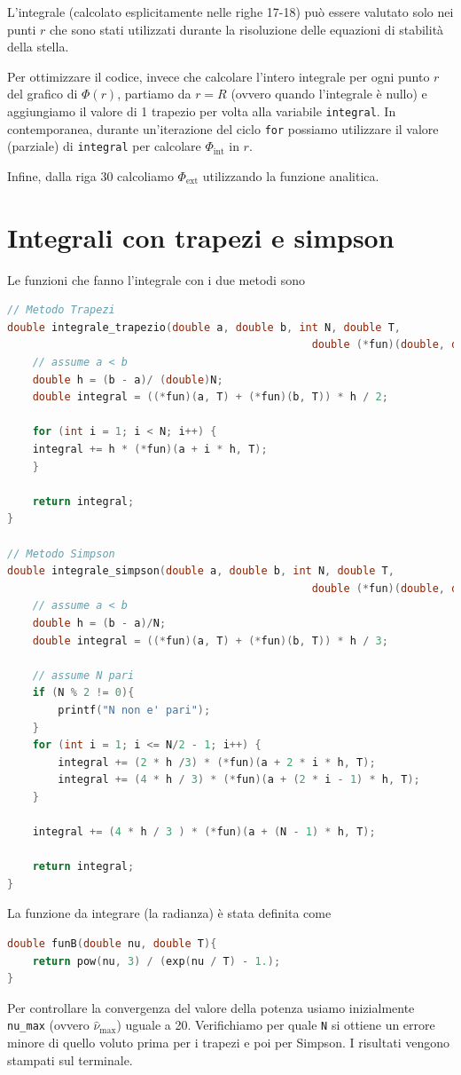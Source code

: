 \documentclass[a4paper, titlepage]{article}
\begin{document}
L'integrale (calcolato esplicitamente nelle righe 17-18) può essere valutato
solo nei punti $r$ che sono stati utilizzati durante la risoluzione delle
equazioni di stabilità della stella.

Per ottimizzare il codice, invece che calcolare l'intero integrale per ogni
punto $r$ del grafico di $\Phi(r)$, partiamo da $r = R$ (ovvero quando
l'integrale è nullo) e aggiungiamo il valore di 1 trapezio per volta alla
variabile \texttt{integral}. In contemporanea, durante un'iterazione del ciclo
\texttt{for} possiamo utilizzare il valore (parziale) di \texttt{integral} per
calcolare $\Phi_\text{int}$ in $r$.

Infine, dalla riga 30 calcoliamo $\Phi_\text{ext}$ utilizzando la funzione
analitica.


\section{Integrali con trapezi e simpson} \label{ap:integrali}

Le funzioni che fanno l'integrale con i due metodi sono

\begin{lstlisting}[language=C]
// Metodo Trapezi
double integrale_trapezio(double a, double b, int N, double T,
                                                double (*fun)(double, double)){
    // assume a < b
    double h = (b - a)/ (double)N;
    double integral = ((*fun)(a, T) + (*fun)(b, T)) * h / 2;

    for (int i = 1; i < N; i++) {
    integral += h * (*fun)(a + i * h, T);
    }

    return integral;
}

// Metodo Simpson
double integrale_simpson(double a, double b, int N, double T,
                                                double (*fun)(double, double)){
    // assume a < b
    double h = (b - a)/N;
    double integral = ((*fun)(a, T) + (*fun)(b, T)) * h / 3;

    // assume N pari
    if (N % 2 != 0){
        printf("N non e' pari");
    }
    for (int i = 1; i <= N/2 - 1; i++) {
        integral += (2 * h /3) * (*fun)(a + 2 * i * h, T);
        integral += (4 * h / 3) * (*fun)(a + (2 * i - 1) * h, T);
    }

    integral += (4 * h / 3 ) * (*fun)(a + (N - 1) * h, T);

    return integral;
}
\end{lstlisting}

La funzione da integrare (la radianza) è stata definita come
\begin{lstlisting}[language=C]
double funB(double nu, double T){
    return pow(nu, 3) / (exp(nu / T) - 1.);
}
\end{lstlisting}
Per controllare la convergenza del valore della potenza usiamo inizialmente
\texttt{nu\_max} (ovvero $\hat \nu_\text{max}$) uguale a 20.
Verifichiamo per quale \texttt{N} si ottiene un errore minore di quello voluto
prima per i trapezi e poi per Simpson.
I risultati vengono stampati sul terminale.
\end{document}
